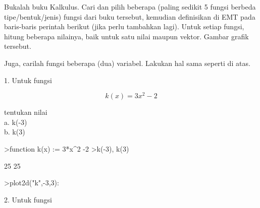 \documentclass[12pt,arial,letterpaper]{book}
\begin{document}
\begin{eulernootebook}
\begin{eulercomment}
\begin{eulercomment}
\begin{eulernootebook}
\begin{eulercomment}
\begin{eulercomment}
\begin{eulercomment}
\begin{eulercomment}
\begin{eulercomment}
\begin{eulercomment}
\begin{eulernotebook}
\begin{eulercomment}
\begin{eulercomment}
\begin{euleroutput}
\end{euleroutput}
\begin{eulercomment}
\begin{eulercomment}
\begin{eulercomment}
Bukalah buku Kalkulus. Cari dan pilih beberapa (paling sedikit 5
fungsi berbeda tipe/bentuk/jenis) fungsi dari buku tersebut, kemudian
definisikan di EMT pada baris-baris perintah berikut (jika perlu
tambahkan lagi). Untuk setiap fungsi, hitung beberapa nilainya, baik
untuk satu nilai maupun vektor. Gambar grafik tersebut.

Juga, carilah fungsi beberapa (dua) variabel. Lakukan hal sama seperti
di atas.

1. Untuk fungsi

\end{eulercomment}
\begin{eulerformula}
\[
k(x)=3x^2-2
\]
\end{eulerformula}
\begin{eulercomment}
tentukan nilai\\
a. k(-3)\\
b. k(3)
\end{eulercomment}
\begin{eulerprompt}
>function k(x) := 3*x^2 -2
>k(-3), k(3)
\end{eulerprompt}
\begin{euleroutput}
  25
  25
\end{euleroutput}
\begin{eulerprompt}
>plot2d("k",-3,3):
\end{eulerprompt}
\begin{eulercomment}
2. Untuk fungsi


\end{eulercomment}
\end{eulercomment}
\end{eulercomment}
\end{eulercomment}
\end{eulercomment}
\end{eulernotebook}
\end{eulercomment}
\end{eulercomment}
\end{eulercomment}
\end{eulercomment}
\end{eulercomment}
\end{eulercomment}
\end{eulernootebook}
\end{eulercomment}
\end{eulercomment}
\end{eulernootebook}
\end{document}
